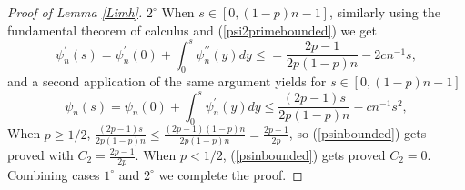 \begin{proof}[Proof of Lemma \ref{Limh}]
$2^{\circ}$ When $s\in[0,(1-p)n-1]$, similarly using the fundamental theorem of calculus and (\ref{psi2primebounded}) we get 
\begin{equation*}
	\psi_{n}^{\prime}(s)=\psi_{n}^{\prime}(0)+\int_{0}^{s}\psi_{n}^{\prime\prime}(y)dy\leq =\frac{2p-1}{2p(1-p)n}-2cn^{-1}s,
\end{equation*}
and a second application of the same argument yields for $s\in[0,(1-p)n-1]$
\begin{equation*}
	\psi_{n}(s)=\psi_{n}(0)+\int_{0}^{s}\psi_{n}^{\prime}(y)dy\leq \frac{(2p-1)s}{2p(1-p)n}-cn^{-1}s^2,
\end{equation*}
When $p\geq 1/2$, $\frac{(2p-1)s}{2p(1-p)n}\leq \frac{(2p-1)(1-p)n}{2p(1-p)n}=\frac{2p-1}{2p}$, so (\ref{psinbounded}) gets proved with $C_{2}=\frac{2p-1}{2p}$. When $p<1/2$, (\ref{psinbounded}) gets proved $C_{2}=0$. Combining cases $1^{\circ}$ and $2^{\circ}$ we complete the proof.
\end{proof}

